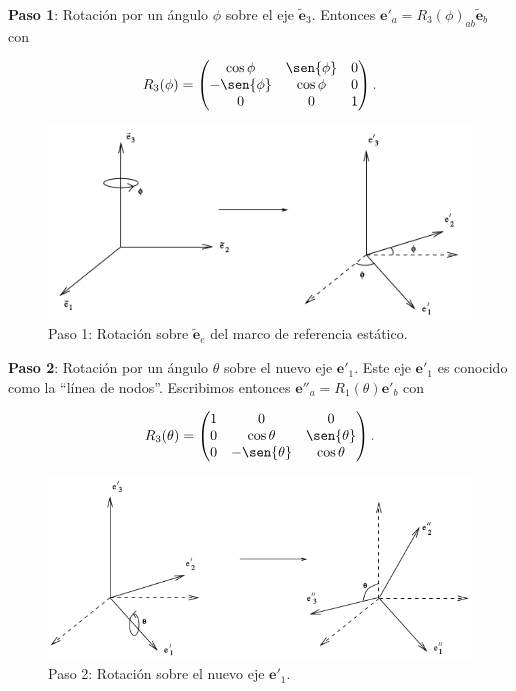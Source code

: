 \documentclass[a4paper,10pt]{article}
\numberwithin{equation}{section}
\begin{document}
\textbf{Paso 1}: Rotación por un ángulo $\phi$ sobre el eje $\tilde{\mathbf{e}}_3$. 
Entonces $\mathbf{e}'_a = R_3(\phi)_{ab}\tilde{\mathbf{e}}_b$ con 

\begin{equation}
 R_3(\phi) = \begin{pmatrix}
              \cos{\phi} & \sen{\phi} & 0 \\
	      -\sen{\phi} & \cos{\phi} & 0 \\
	      0 & 0 & 1
	     \end{pmatrix}.
\end{equation}

\begin{figure}[H]
  \center 
  \includegraphics[scale=0.6]{problema5fig2}
  \caption{Paso 1: Rotación sobre $\tilde{\mathbf{e}}_e$ del marco de referencia 
  estático.}
\end{figure}

\textbf{Paso 2}: Rotación por un ángulo $\theta$ sobre el nuevo eje $\mathbf{e}'_1$. 
Este eje $\mathbf{e}'_1$ es conocido como la ``línea de nodos''. Escribimos entonces 
$\mathbf{e}''_a = R_1(\theta)\mathbf{e}'_b$ con 

\begin{equation}
 R_3(\theta) = \begin{pmatrix}
              1 & 0 & 0 \\
	      0 & \cos{\theta} & \sen{\theta} \\
	      0 & -\sen{\theta} & \cos{\theta}
	     \end{pmatrix}.
\end{equation}

\begin{figure}[H]
  \center 
  \includegraphics[scale=0.6]{problema5fig3}
  \caption{Paso 2: Rotación sobre el nuevo eje $\mathbf{e}'_1$.}
\end{figure}
\end{document}
